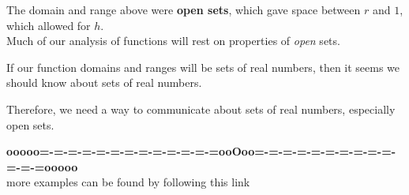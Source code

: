 \documentclass{ximera}
\begin{document}
The domain and range above were \textbf{\textcolor{purple!85!blue}{open sets}}, which gave space between $r$ and $1$, which allowed for $h$. \\

Much of our analysis of functions will rest on properties of \textit{open} sets. \


If our function domains and ranges will be sets of real numbers, then it seems we should know about sets of real numbers.

Therefore, we need a way to communicate about sets of real numbers, especially open sets.















\begin{center}
\textbf{\textcolor{green!50!black}{ooooo=-=-=-=-=-=-=-=-=-=-=-=-=ooOoo=-=-=-=-=-=-=-=-=-=-=-=-=ooooo}} \\

more examples can be found by following this link\\ 

\end{center}
\end{document}

